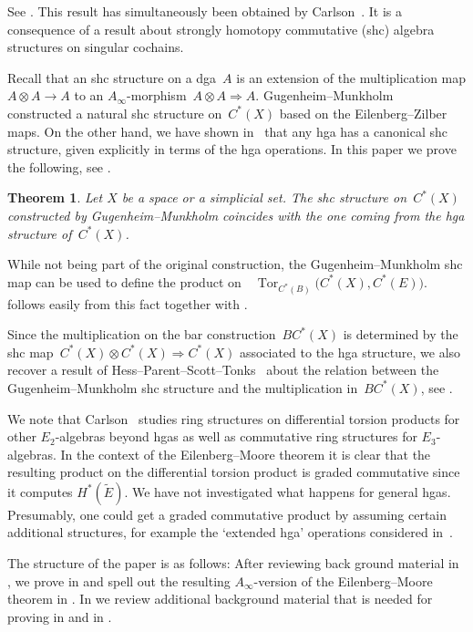 \documentclass[letterpaper]{amsart}
\numberwithin{equation}{section}
\theoremstyle{plain}
\newtheorem{theorem}{Theorem}[section]
\theoremstyle{definition}
\theoremstyle{remark}
\DeclareMathOperator{\Tor}{Tor}
\def\Ainf{A_{\infty}}
\def\gE{\tilde{E}}
\begin{document}
See . This result has simultaneously been obtained by Carlson~\cite{Carlson:product}.
It is a consequence of a result about
strongly homotopy commutative (shc) algebra structures on singular cochains.

Recall that an shc structure on a dga~$A$ is an extension of the multiplication map $A\otimes A\to A$
to an $\Ainf$-morphism~$A\otimes A\Rightarrow A$.
Gugenheim--Munkholm~\cite{GugenheimMunkholm:1974} constructed a natural shc structure on~$C^{*}(X)$
based on the Eilenberg--Zilber maps. On the other hand, we have shown in~\cite{Franz:hgashc} that
any hga has a canonical shc structure, given explicitly in terms of the hga operations.
In this paper we prove the following, see .

\begin{theorem}
  \label{thm:main-3}
  Let $X$ be a space or a simplicial set.
  The shc structure on~$C^{*}(X)$ constructed by Gugenheim--Munkholm coincides
  with the one coming from the hga structure of~$C^{*}(X)$.
\end{theorem}

While not being part of the original construction,
the Gugenheim--Munkholm shc map can be used to define the product on~~$\Tor_{C^{*}(B)}\bigl(C^{*}(X),C^{*}(E)\bigr)$.
 follows easily from this fact together with .

Since the multiplication on the bar construction~$B C^{*}(X)$ is determined by
the shc map~$C^{*}(X)\otimes C^{*}(X)\Rightarrow C^{*}(X)$ associated to the hga structure,
we also recover a result of Hess--Parent--Scott--Tonks~\cite{HessEtAl:2006} about the relation
between the Gugenheim--Munkholm shc structure and the multiplication in~$B C^{*}(X)$, see .

We note that Carlson~\cite{Carlson:ring} studies ring structures on differential torsion products
for other $E_{2}$-algebras beyond hgas as well as commutative ring structures for $E_{3}$-algebras.
In the context of the Eilenberg--Moore theorem it is clear that the resulting product on the differential torsion product
is graded commutative since it computes $H^{*}(\gE)$.
We have not investigated what happens for general hgas. Presumably,
one could get a graded commutative product by assuming certain additional structures,
for example the `extended hga' operations considered in~\cite[Sec.~3.2]{Franz:hgashc}.

The structure of the paper is as follows: After reviewing back ground material in ,
we prove  in  and spell out the resulting $\Ainf$-version of the
Eilenberg--Moore theorem in . In  we review additional background material
that is needed for proving  in  and  in .
\end{document}
